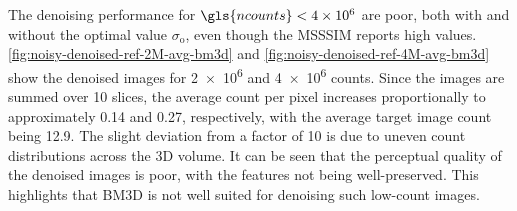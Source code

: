 The denoising performance for $\gls{ncounts}<\num{4e6}$ are poor, both with and without the optimal value $\sigma_{\text{o}}$, even though the \gls{MSSSIM} reports high values. \cref{fig:noisy-denoised-ref-2M-avg-bm3d} and \cref{fig:noisy-denoised-ref-4M-avg-bm3d} show the denoised images for \num{2e6} and \num{4e6} counts. Since the images are summed over \num{10} slices, the average count per pixel increases proportionally to approximately \num{0.14} and \num{0.27}, respectively, with the average target image count being \num{12.9}. The slight deviation from a factor of \num{10} is due to uneven count distributions across the 3D volume. It can be seen that the perceptual quality of the denoised images is poor, with the features not being well-preserved. This highlights that \gls{BM3D} is not well suited for denoising such low-count images.

